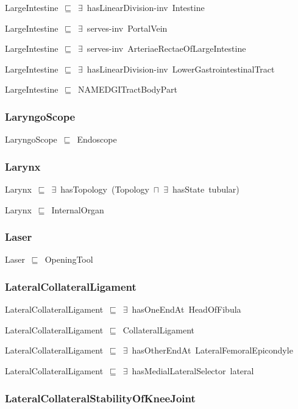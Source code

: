 \documentclass{article}
\begin{document}
LargeIntestine~\ensuremath{\sqsubseteq}~\ensuremath{\exists}~hasLinearDivision-inv~Intestine~

LargeIntestine~\ensuremath{\sqsubseteq}~\ensuremath{\exists}~serves-inv~PortalVein~

LargeIntestine~\ensuremath{\sqsubseteq}~\ensuremath{\exists}~serves-inv~ArteriaeRectaeOfLargeIntestine~

LargeIntestine~\ensuremath{\sqsubseteq}~\ensuremath{\exists}~hasLinearDivision-inv~LowerGastrointestinalTract~

LargeIntestine~\ensuremath{\sqsubseteq}~NAMEDGITractBodyPart~

\subsubsection*{LaryngoScope}

LaryngoScope~\ensuremath{\sqsubseteq}~Endoscope~

\subsubsection*{Larynx}

Larynx~\ensuremath{\sqsubseteq}~\ensuremath{\exists}~hasTopology~(Topology~\ensuremath{\sqcap}~\ensuremath{\exists}~hasState~tubular)~

Larynx~\ensuremath{\sqsubseteq}~InternalOrgan~

\subsubsection*{Laser}

Laser~\ensuremath{\sqsubseteq}~OpeningTool~

\subsubsection*{LateralCollateralLigament}

LateralCollateralLigament~\ensuremath{\sqsubseteq}~\ensuremath{\exists}~hasOneEndAt~HeadOfFibula~

LateralCollateralLigament~\ensuremath{\sqsubseteq}~CollateralLigament~

LateralCollateralLigament~\ensuremath{\sqsubseteq}~\ensuremath{\exists}~hasOtherEndAt~LateralFemoralEpicondyle~

LateralCollateralLigament~\ensuremath{\sqsubseteq}~\ensuremath{\exists}~hasMedialLateralSelector~lateral~

\subsubsection*{LateralCollateralStabilityOfKneeJoint}
\end{document}

